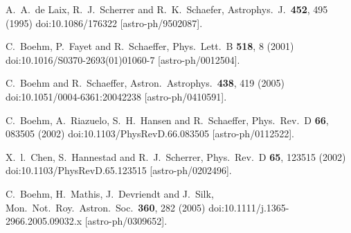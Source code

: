 \documentclass[aps,prd,a4paper,twocolumn,amsmath,showpacs,superscriptaddress,nofootinbib,preprintnumbers]{revtex4-1}
\begin{document}
\begin{thebibliography}{99}

  A.~A.~de Laix, R.~J.~Scherrer and R.~K.~Schaefer,
  Astrophys.\ J.\  {\bf 452}, 495 (1995)
  doi:10.1086/176322
  [astro-ph/9502087].
  

  C.~Boehm, P.~Fayet and R.~Schaeffer,
  Phys.\ Lett.\ B {\bf 518}, 8 (2001)
  doi:10.1016/S0370-2693(01)01060-7
  [astro-ph/0012504].
  
  C.~Boehm and R.~Schaeffer,
  Astron.\ Astrophys.\  {\bf 438}, 419 (2005)
  doi:10.1051/0004-6361:20042238
  [astro-ph/0410591].
  
  C.~Boehm, A.~Riazuelo, S.~H.~Hansen and R.~Schaeffer,
  Phys.\ Rev.\ D {\bf 66}, 083505 (2002)
  doi:10.1103/PhysRevD.66.083505
  [astro-ph/0112522].
   
   
   
  X.~l.~Chen, S.~Hannestad and R.~J.~Scherrer,
  Phys.\ Rev.\ D {\bf 65}, 123515 (2002)
  doi:10.1103/PhysRevD.65.123515
  [astro-ph/0202496].
  
  
  C.~Boehm, H.~Mathis, J.~Devriendt and J.~Silk,
  Mon.\ Not.\ Roy.\ Astron.\ Soc.\  {\bf 360}, 282 (2005)
  doi:10.1111/j.1365-2966.2005.09032.x
  [astro-ph/0309652].
  

\end{thebibliography}
\end{document}
